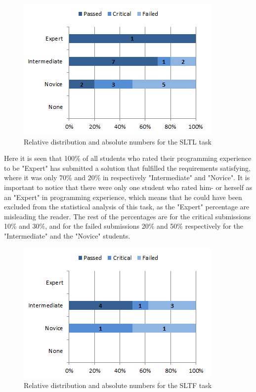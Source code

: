 \documentclass{sig-alternate-05-2015}
\begin{document}
\begin{figure}[!ht]
	\centering
	\includegraphics[width=1\linewidth]{img06}
	\caption{Relative distribution and absolute numbers for the SLTL task}
	\label{fig:SLTL percentage distributions with relative task numbers}
\end{figure}

Here it is seen that 100\% of all students who rated their programming experience to be "Expert" has submitted a solution that fulfilled the requirements satisfying, where it was only 70\% and 20\% in respectively "Intermediate" and "Novice".
It is important to notice that there were only one student who rated him- or herself as an "Expert" in programming experience, which means that he could have been excluded from the statistical analysis of this task, as the "Expert" percentage are misleading the reader. The rest of the percentages are for the critical submissions 10\% and 30\%, and for the failed submissions 20\% and 50\% respectively for the "Intermediate" and the "Novice" students.

\begin{figure}[!ht]
	\centering
	\includegraphics[width=1\linewidth]{img07}
	\caption{Relative distribution and absolute numbers for the SLTF task}
	\label{fig:SLTF percentage distributions with relative task numbers}
\end{figure}
\end{document}
